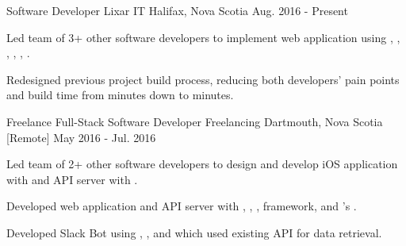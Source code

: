 

\begin{cventries}

  \cventry
    {Software Developer} %
    {Lixar IT} %
    {Halifax, Nova Scotia} %
    {Aug. 2016 - Present} %
    {
      \begin{cvitems} %
	\item {Led team of 3+ other software developers to implement web application using , , , , , .}
	\item {Redesigned previous project build process, reducing both developers' pain points and build time from  minutes down to  minutes.}
      \end{cvitems}
    }

  \cventry
    {Freelance Full-Stack Software Developer} %
    {Freelancing} %
    {Dartmouth, Nova Scotia [Remote]} %
    {May 2016 - Jul. 2016} %
    {
      \begin{cvitems} %
        \item {Led team of 2+ other software developers to design and develop iOS application with  and  API server with .}
        \item {Developed web application and  API server with , , ,  framework, and 's .}
        \item {Developed Slack Bot using , , and  which used existing API for data retrieval.}
      \end{cvitems}
    }


\end{cventries}
